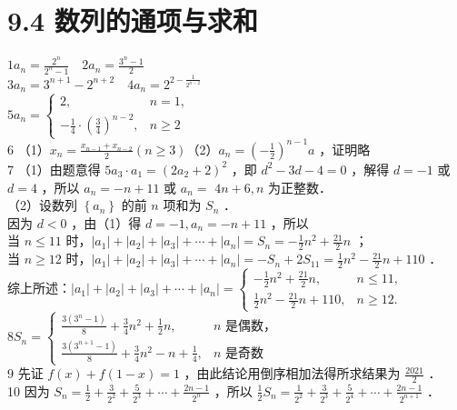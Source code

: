 \documentclass[10pt]{article}
\begin{document}
\section*{9.4 数列的通项与求和}
\(1 a_{n}=\frac{2^{n}}{2^{n}-1} \quad 2 a_{n}=\frac{3^{n}-1}{2}\)\\
\(3 a_{n}=3^{n+1}-2^{n+2} \quad 4 a_{n}=2^{2-\frac{1}{2^{n-2}}}\)\\
\(5 a_{n}= \begin{cases}2, & n=1, \\ -\frac{1}{4} \cdot\left(\frac{3}{4}\right)^{n-2}, & n \geqslant 2\end{cases}\)\\
6 （1）\(x_{n}=\frac{x_{n-1}+x_{n-2}}{2}(n \geqslant 3)\)（2）\(a_{n}=\left(-\frac{1}{2}\right)^{n-1} a\) ，证明略\\
7 （1）由题意得 \(5 a_{3} \cdot a_{1}=\left(2 a_{2}+2\right)^{2}\) ，即 \(d^{2}-3 d-4=0\) ，解得 \(d=-1\) 或 \(d=4\) ，所以 \(a_{n}=-n+11\) 或 \(a_{n}=\) \(4 n+6, n\) 为正整数．\\
（2）设数列 \(\left\{a_{n}\right\}\) 的前 \(n\) 项和为 \(S_{n}\) ．\\
因为 \(d<0\) ，由（1）得 \(d=-1, a_{n}=-n+11\) ，所以\\
当 \(n \leqslant 11\) 时，\(\left|a_{1}\right|+\left|a_{2}\right|+\left|a_{3}\right|+\cdots+\left|a_{n}\right|=S_{n}=-\frac{1}{2} n^{2}+\frac{21}{2} n\) ；\\
当 \(n \geqslant 12\) 时，\(\left|a_{1}\right|+\left|a_{2}\right|+\left|a_{3}\right|+\cdots+\left|a_{n}\right|=-S_{n}+2 S_{11}=\frac{1}{2} n^{2}-\frac{21}{2} n+110\) ．\\
综上所述：\(\left|a_{1}\right|+\left|a_{2}\right|+\left|a_{3}\right|+\cdots+\left|a_{n}\right|= \begin{cases}-\frac{1}{2} n^{2}+\frac{21}{2} n, & n \leqslant 11, \\ \frac{1}{2} n^{2}-\frac{21}{2} n+110, & n \geqslant 12 .\end{cases}\)\\
\(8 S_{n}= \begin{cases}\frac{3\left(3^{n}-1\right)}{8}+\frac{3}{4} n^{2}+\frac{1}{2} n, & n \text { 是偶数，} \\ \frac{3\left(3^{n+1}-1\right)}{8}+\frac{3}{4} n^{2}-n+\frac{1}{4}, & n \text { 是奇数 }\end{cases}\)\\
9 先证 \(f(x)+f(1-x)=1\) ，由此结论用倒序相加法得所求结果为 \(\frac{2021}{2}\) ．\\
10 因为 \(S_{n}=\frac{1}{2}+\frac{3}{2^{2}}+\frac{5}{2^{3}}+\cdots+\frac{2 n-1}{2^{n}}\) ，所以 \(\frac{1}{2} S_{n}=\frac{1}{2^{2}}+\frac{3}{2^{3}}+\frac{5}{2^{4}}+\cdots+\frac{2 n-1}{2^{n+1}}\) ．\\
\end{document}
